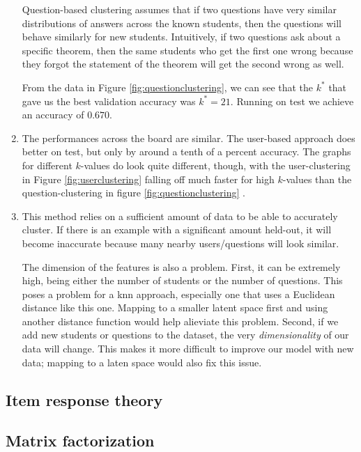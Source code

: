 \documentclass[twocolumn]{article}
\begin{document}
\begin{enumerate}
Question-based clustering assumes that if two questions have very similar
distributions of answers across the known students, then the questions will
behave similarly for new students. Intuitively, if two questions ask about a
specific theorem, then the same students who get the first one wrong because
they forgot the statement of the theorem will get the second wrong as well.

From the data in Figure \ref{fig:questionclustering}, we can see that the $k^*$ that gave us the best validation
accuracy was $k^* = 21$. Running on test we achieve an accuracy of $0.670$.

\item
The performances across the board are similar. The user-based approach does
better on test, but only by around a tenth of a percent accuracy. The graphs
for different $k$-values do look quite different, though, with the
user-clustering in Figure \ref{fig:userclustering} falling off much faster for
high $k$-values than the question-clustering in figure
\ref{fig:questionclustering} .

\item

This method relies on a sufficient amount of data to be able to accurately
cluster. If there is an example with a significant amount held-out, it will
become inaccurate because many nearby users/questions will look similar.

The dimension of the features is also a problem. First, it can be extremely
high, being either the number of students or the number of questions. This
poses a problem for a {\sc knn} approach, especially one that uses a Euclidean
distance like this one. Mapping to a smaller latent space first and using
another distance function would help alieviate this problem. Second, if we add
new students or questions to the dataset, the very {\it dimensionality} of our
data will change. This makes it more difficult to improve our model with new
data; mapping to a laten space would also fix this issue.

\end{enumerate}

\subsection{Item response theory}
\blindtext

\subsection{Matrix factorization}
\end{document}
